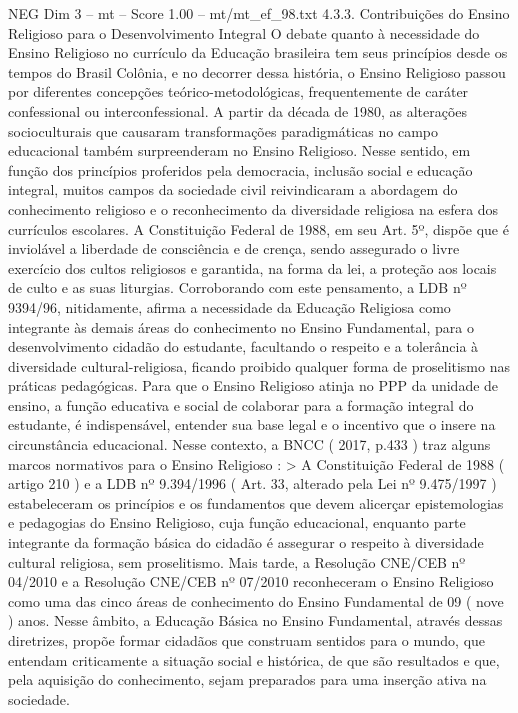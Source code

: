 \begin{textsample}{NEG Dim 3 – mt – Score 1.00 – mt/mt\_ef\_98.txt}  \label{ex:f3_neg_218}
4.3.3.
Contribuições do Ensino Religioso para o Desenvolvimento Integral O debate quanto à necessidade do Ensino Religioso no currículo da Educação brasileira tem seus princípios desde os tempos do Brasil Colônia, e no decorrer dessa história, o Ensino Religioso passou por diferentes concepções teórico-metodológicas, frequentemente de caráter confessional ou interconfessional.
A partir da década de 1980, as alterações socioculturais que causaram transformações paradigmáticas no campo educacional também surpreenderam no Ensino Religioso.
Nesse sentido, em função dos princípios proferidos pela democracia, inclusão social e educação integral, muitos campos da sociedade civil reivindicaram a abordagem do conhecimento religioso e o reconhecimento da diversidade religiosa na esfera dos currículos escolares.
A Constituição Federal de 1988, em seu Art. 5º, dispõe que é inviolável a liberdade de consciência e de crença, sendo assegurado o livre exercício dos cultos religiosos e garantida, na forma da lei, a proteção aos locais de culto e as suas liturgias.
Corroborando com este pensamento, a LDB nº 9394/96, nitidamente, afirma a necessidade da Educação Religiosa como integrante às demais áreas do conhecimento no Ensino Fundamental, para o desenvolvimento cidadão do estudante, facultando o respeito e a tolerância à diversidade cultural-religiosa, ficando proibido qualquer forma de proselitismo nas práticas pedagógicas.
Para que o Ensino Religioso atinja no PPP da unidade de ensino, a função educativa e social de colaborar para a formação integral do estudante, é indispensável, entender sua base legal e o incentivo que o insere na circunstância educacional.
Nesse contexto, a BNCC ( 2017, p.433 ) traz alguns marcos normativos para o Ensino Religioso : > A Constituição Federal de 1988 ( artigo 210 ) e a LDB nº 9.394/1996 ( Art. 33, alterado pela Lei nº 9.475/1997 ) estabeleceram os princípios e os fundamentos que devem alicerçar epistemologias e pedagogias do Ensino Religioso, cuja função educacional, enquanto parte integrante da formação básica do cidadão é assegurar o respeito à diversidade cultural religiosa, sem proselitismo.
Mais tarde, a Resolução CNE/CEB nº 04/2010 e a Resolução CNE/CEB nº 07/2010 reconheceram o Ensino Religioso como uma das cinco áreas de conhecimento do Ensino Fundamental de 09 ( nove ) anos.
Nesse âmbito, a Educação Básica no Ensino Fundamental, através dessas diretrizes, propõe formar cidadãos que construam sentidos para o mundo, que entendam criticamente a situação social e histórica, de que são resultados e que, pela aquisição do conhecimento, sejam preparados para uma inserção ativa na sociedade.

\end{textsample}

